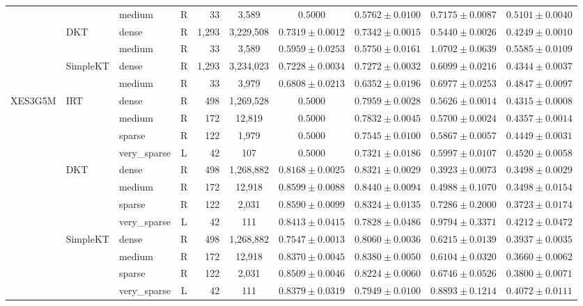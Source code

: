 \begin{tableorg}[htbp]
{\begin{tabular}{lllcrccccc}
 &  & medium & R & 33 & 3,589 & $0.5000$ & $0.5762 \pm 0.0100$ & $0.7175 \pm 0.0087$ & $0.5101 \pm 0.0040$ \\
 & DKT & dense & R & 1,293 & 3,229,508 & $0.7319 \pm 0.0012$ & $0.7342 \pm 0.0015$ & $0.5440 \pm 0.0026$ & $0.4249 \pm 0.0010$ \\
 &  & medium & R & 33 & 3,589 & $0.5959 \pm 0.0253$ & $0.5750 \pm 0.0161$ & $1.0702 \pm 0.0639$ & $0.5585 \pm 0.0109$ \\
 & SimpleKT & dense & R & 1,293 & 3,234,023 & $0.7228 \pm 0.0034$ & $0.7272 \pm 0.0032$ & $0.6099 \pm 0.0216$ & $0.4344 \pm 0.0037$ \\
 &  & medium & R & 33 & 3,979 & $0.6808 \pm 0.0213$ & $0.6352 \pm 0.0196$ & $0.6977 \pm 0.0253$ & $0.4847 \pm 0.0097$ \\
\midrule
XES3G5M & IRT & dense & R & 498 & 1,269,528 & $0.5000$ & $0.7959 \pm 0.0028$ & $0.5626 \pm 0.0014$ & $0.4315 \pm 0.0008$ \\
 &  & medium & R & 172 & 12,819 & $0.5000$ & $0.7832 \pm 0.0045$ & $0.5700 \pm 0.0024$ & $0.4357 \pm 0.0014$ \\
 &  & sparse & R & 122 & 1,979 & $0.5000$ & $0.7545 \pm 0.0100$ & $0.5867 \pm 0.0057$ & $0.4449 \pm 0.0031$ \\
 &  & very\_sparse & L & 42 & 107 & $0.5000$ & $0.7321 \pm 0.0186$ & $0.5997 \pm 0.0107$ & $0.4520 \pm 0.0058$ \\
 & DKT & dense & R & 498 & 1,268,882 & $0.8168 \pm 0.0025$ & $0.8321 \pm 0.0029$ & $0.3923 \pm 0.0073$ & $0.3498 \pm 0.0029$ \\
 &  & medium & R & 172 & 12,918 & $0.8599 \pm 0.0088$ & $0.8440 \pm 0.0094$ & $0.4988 \pm 0.1070$ & $0.3498 \pm 0.0154$ \\
 &  & sparse & R & 122 & 2,031 & $0.8590 \pm 0.0099$ & $0.8324 \pm 0.0135$ & $0.7286 \pm 0.2000$ & $0.3723 \pm 0.0174$ \\
 &  & very\_sparse & L & 42 & 111 & $0.8413 \pm 0.0415$ & $0.7828 \pm 0.0486$ & $0.9794 \pm 0.3371$ & $0.4212 \pm 0.0472$ \\
 & SimpleKT & dense & R & 498 & 1,268,882 & $0.7547 \pm 0.0013$ & $0.8060 \pm 0.0036$ & $0.6215 \pm 0.0139$ & $0.3937 \pm 0.0035$ \\
 &  & medium & R & 172 & 12,918 & $0.8370 \pm 0.0045$ & $0.8380 \pm 0.0050$ & $0.6104 \pm 0.0320$ & $0.3660 \pm 0.0062$ \\
 &  & sparse & R & 122 & 2,031 & $0.8509 \pm 0.0046$ & $0.8224 \pm 0.0060$ & $0.6746 \pm 0.0526$ & $0.3800 \pm 0.0071$ \\
 &  & very\_sparse & L & 42 & 111 & $0.8379 \pm 0.0319$ & $0.7949 \pm 0.0100$ & $0.8893 \pm 0.1214$ & $0.4072 \pm 0.0111$ \\
\bottomrule


\end{tabular}}
\end{tableorg}
